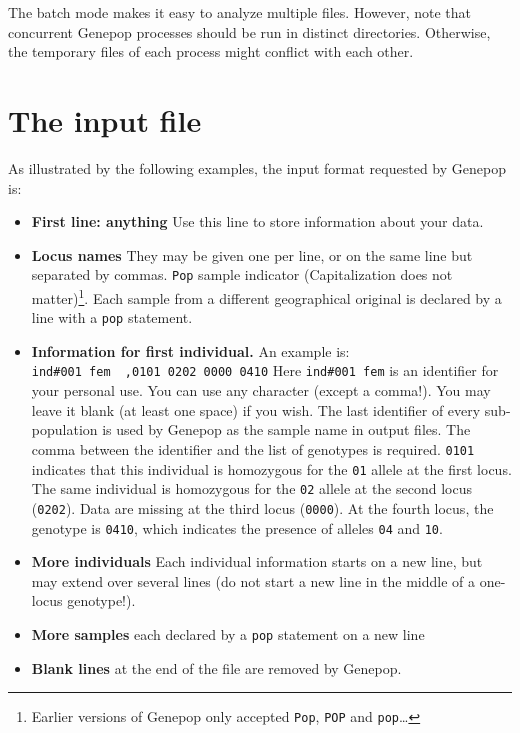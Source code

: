 \documentclass[12pt,]{book}
\providecommand{\tightlist}{%
  \setlength{\itemsep}{0pt}\setlength{\parskip}{0pt}}
\let\rmarkdownfootnote\footnote%
\def\footnote{\protect\rmarkdownfootnote}
\begin{document}
The batch mode makes it easy to analyze multiple files. However, note
that concurrent Genepop processes should be
run in distinct directories. Otherwise, the temporary files of each
process might conflict with each other.

\chapter{The input file}\label{the-input-file}

 As illustrated by the following examples, the input
format requested by Genepop is:

\begin{itemize}
\tightlist
\item
  \textbf{First line: anything} Use this line to store information about
  your data.
\item
  \textbf{Locus names} They may be given one per line, or on the same
  line but separated by commas. \texttt{Pop} sample indicator
  (Capitalization does not matter)\footnote{Earlier versions of Genepop
    only accepted \texttt{Pop}, \texttt{POP} and \texttt{pop}\ldots{}}.
  Each sample from a different geographical original is declared by a
  line with a \texttt{pop} statement.
\item
  \textbf{Information for first individual.} An example is:
  \texttt{ind\#001\ fem\ \ ,0101\ 0202\ 0000\ 0410} Here
  \texttt{ind\#001\ fem} is an identifier for your personal use. You can
  use any character (except a comma!). You may leave it blank (at least
  one space) if you wish. The last identifier of every sub-population is
  used by Genepop as the sample name in output files. The comma between
  the identifier and the list of genotypes is required. \texttt{0101}
  indicates that this individual is homozygous for the \texttt{01}
  allele at the first locus. The same individual is homozygous for the
  \texttt{02} allele at the second locus (\texttt{0202}). Data are
  missing at the third locus (\texttt{0000}). At the fourth locus, the
  genotype is \texttt{0410}, which indicates the presence of alleles
  \texttt{04} and \texttt{10}.
\item
  \textbf{More individuals} Each individual information starts on a new
  line, but may extend over several lines (do not start a new line in
  the middle of a one-locus genotype!).
\item
  \textbf{More samples} each declared by a \texttt{pop} statement on a
  new line
\item
  \textbf{Blank lines} at the end of the file are removed by Genepop.
\end{itemize}
\end{document}
